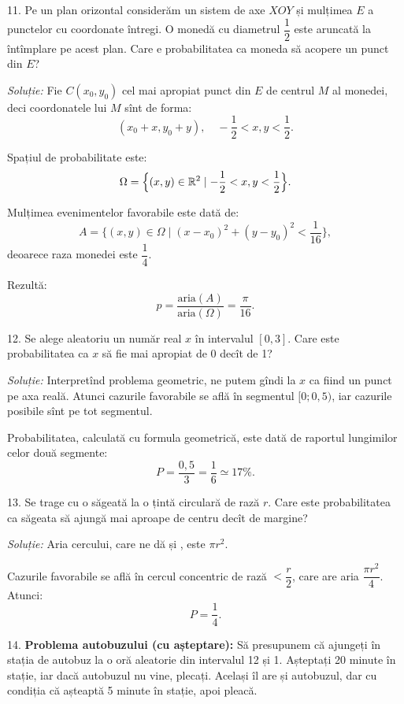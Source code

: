 11. Pe un plan orizontal considerăm un sistem de axe $ XOY $ și mulțimea $ E $
a punctelor cu coordonate întregi. O monedă cu diametrul $ \dfrac{1}{2} $ este
aruncată la întîmplare pe acest plan. Care e probabilitatea ca moneda să
acopere un punct din $ E $?

\emph{Soluție:} Fie $ C(x_0, y_0) $ cel mai apropiat punct din $ E $ de centrul
$ M $ al monedei, deci coordonatele lui $ M $ sînt de forma:
\[
  (x_0 + x, y_0 + y), \quad -\frac{1}{2} < x,y < \frac{1}{2}.
\]

Spațiul de probabilitate este:
\[
  \Omega = \Big\{(x, y) \in \mathbb{R}^2 \mid -\frac{1}{2} < x,y < \frac{1}{2} \Big\}.
\]

Mulțimea evenimentelor favorabile este dată de:
\[
  A = \Big\{(x, y) \in \Omega \mid (x - x_0)^2 + (y - y_0)^2 < \frac{1}{16} \Big\},
\]
deoarece raza monedei este $ \dfrac{1}{4} $.

Rezultă:
\[
  p = \frac{\text{aria}(A)}{\text{aria}(\Omega)} = \frac{\pi}{16}.
\]

\vspace{0.3cm}

12. Se alege aleatoriu un număr real $ x $ în intervalul $ [0, 3] $. Care este
probabilitatea ca $ x $ să fie mai apropiat de 0 decît de 1?

\emph{Soluție:} Interpretînd problema geometric, ne putem gîndi la $ x $ ca fiind
un punct pe axa reală. Atunci cazurile favorabile se află în segmentul $ [0; 0,5) $,
iar cazurile posibile sînt pe tot segmentul.

Probabilitatea, calculată cu formula geometrică, este dată de raportul lungimilor
celor două segmente:
\[
  P = \frac{0,5}{3} = \frac{1}{6} \simeq 17\%.
\]

\vspace{0.3cm}

13. Se trage cu o săgeată la o țintă circulară de rază $ r $. Care este probabilitatea
ca săgeata să ajungă mai aproape de centru decît de margine?

\emph{Soluție:} Aria cercului, care ne dă și , este $ \pi r^2 $.

Cazurile favorabile se află în cercul concentric de rază $ < \dfrac{r}{2} $, care are
aria $ \dfrac{\pi r^2}{4} $. Atunci:
\[
  P = \frac{1}{4}.
\]

\vspace{0.3cm}

14. \textbf{Problema autobuzului (cu așteptare):} Să presupunem că ajungeți în stația
de autobuz la o oră aleatorie din intervalul 12 și 1. Așteptați 20 minute în stație,
iar dacă autobuzul nu vine, plecați. Același  îl are și autobuzul, dar
cu condiția că așteaptă 5 minute în stație, apoi pleacă.

